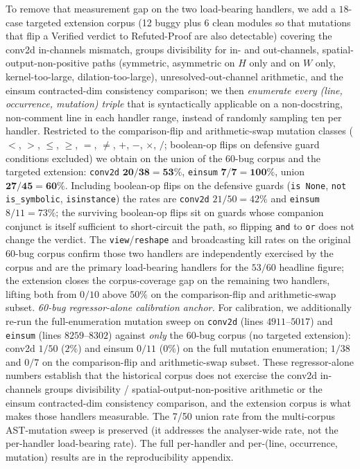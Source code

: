 To remove that measurement gap on the two load-bearing handlers,
we add a $18$-case targeted extension corpus (12 buggy plus 6 clean
modules so that mutations that flip a Verified verdict to
Refuted-Proof are also detectable) covering the conv2d
in-channels mismatch, groups divisibility for in- and out-channels,
spatial-output-non-positive paths (symmetric, asymmetric on $H$
only and on $W$ only, kernel-too-large, dilation-too-large),
unresolved-out-channel arithmetic, and the einsum
contracted-dim consistency comparison; we then \emph{enumerate
every (line, occurrence, mutation) triple} that is syntactically
applicable on a non-docstring, non-comment line in each handler
range, instead of randomly sampling ten per handler.  Restricted
to the comparison-flip and arithmetic-swap mutation classes
($<$, $>$, $\le$, $\ge$, $=$, $\neq$, $+$, $-$, $\times$, $/$;
boolean-op flips on defensive guard conditions excluded) we
obtain on the union of the $60$-bug corpus and the targeted
extension: \texttt{conv2d} $\mathbf{20/38 = 53\%}$, \texttt{einsum}
$\mathbf{7/7 = 100\%}$, union $\mathbf{27/45 = 60\%}$.  Including
boolean-op flips on the defensive guards (\texttt{is None},
\texttt{not is\_symbolic}, \texttt{isinstance}) the rates are
\texttt{conv2d} $21/50 = 42\%$ and \texttt{einsum} $8/11 = 73\%$;
the surviving boolean-op flips sit on guards whose companion
conjunct is itself sufficient to short-circuit the path, so
flipping \texttt{and} to \texttt{or} does not change the verdict.
The \texttt{view}/\texttt{reshape} and broadcasting kill rates
on the original $60$-bug corpus confirm those two handlers are
independently exercised by the corpus and are the primary
load-bearing handlers for the $53/60$ headline figure; the
extension closes the corpus-coverage gap on the remaining two
handlers, lifting both from $0/10$ above $50\%$ on the
comparison-flip and arithmetic-swap subset.
\emph{60-bug regressor-alone calibration anchor.} For
calibration, we additionally re-run the full-enumeration
mutation sweep on \texttt{conv2d} (lines $4911$--$5017$) and
\texttt{einsum} (lines $8259$--$8302$) against \emph{only} the
$60$-bug corpus (no targeted extension): conv2d $1/50$ ($2\%$)
and einsum $0/11$ ($0\%$) on the full mutation enumeration;
$1/38$ and $0/7$ on the comparison-flip and arithmetic-swap
subset. These regressor-alone numbers establish that the
historical corpus does not exercise the conv2d in-channels
groups divisibility / spatial-output-non-positive arithmetic
or the einsum contracted-dim consistency comparison, and the
extension corpus is what makes those handlers measurable.
The 7/50 union rate from the multi-corpus AST-mutation sweep is
preserved (it addresses the analyser-wide rate, not the
per-handler load-bearing rate).
The full per-handler and per-(line, occurrence, mutation)
results are in the reproducibility appendix.

